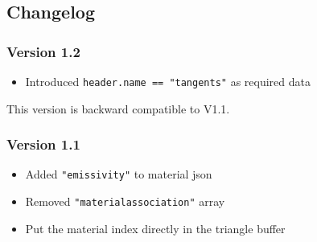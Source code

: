 \documentclass[english,10pt,a4paper,twocolumn,colorscheme=green]{orarticle}
\begin{document}
	\subsection{Changelog}
	\subsubsection{Version 1.2}
	\begin{itemize}
		\item Introduced \lstinline|header.name == "tangents"| as required data
	\end{itemize}
	This version is backward compatible to V1.1.
	\subsubsection{Version 1.1}
	\begin{itemize}
		\item Added \lstinline|"emissivity"| to material json
		\item Removed \lstinline|"materialassociation"| array
		\item Put the material index directly in the triangle buffer
	\end{itemize}
\end{document}
